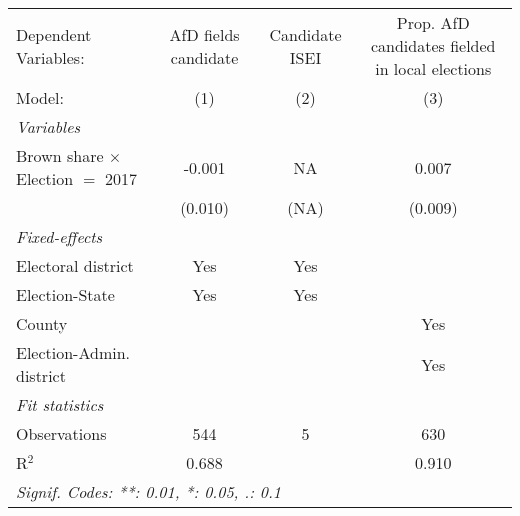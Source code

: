 \begingroup
\centering
\begin{tabular}{lccc}
   \tabularnewline \midrule \midrule
   Dependent Variables:                    & AfD fields candidate & Candidate ISEI & Prop. AfD candidates fielded in local elections\\  
   Model:                                  & (1)                  & (2)            & (3)\\  
   \midrule
   \emph{Variables}\\
   Brown share $\times$ Election $=$ 2017  & -0.001               & NA             & 0.007\\   
                                           & (0.010)              & (NA)           & (0.009)\\   
   \midrule
   \emph{Fixed-effects}\\
   Electoral district                      & Yes                  & Yes            & \\  
   Election-State                          & Yes                  & Yes            & \\  
   County                                  &                      &                & Yes\\  
   Election-Admin. district                &                      &                & Yes\\  
   \midrule
   \emph{Fit statistics}\\
   Observations                            & 544                  & 5              & 630\\  
   R$^2$                                   & 0.688                &                & 0.910\\  
   \midrule \midrule
   \multicolumn{4}{l}{\emph{Signif. Codes: **: 0.01, *: 0.05, .: 0.1}}\\
\end{tabular}
\par\endgroup


